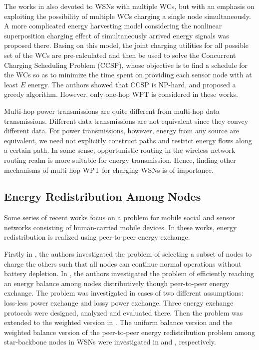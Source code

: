 \documentclass[journal,10pt]{IEEEtran}
\begin{document}
The works in \cite{Guo2017,Guo2016} also devoted to WSNs with multiple WCs, but with an emphasis on exploiting the possibility of multiple WCs charging a single node simultaneously. A more complicated energy harvesting model considering the nonlinear superposition charging effect of simultaneously arrived energy signals was proposed there. Basing on this model, the joint charging utilities for all possible set of the WCs are pre-calculated and then be used to solve the Concurrent Charging Scheduling Problem (CCSP), whose objective is to find a schedule for the WCs so as to minimize the time spent on providing each sensor node with at least $E$ energy. The authors showed that CCSP is NP-hard, and proposed a greedy algorithm. However, only one-hop WPT is considered in these works.

Multi-hop power transmissions are quite different from multi-hop data transmissions. Different data transmissions are not equivalent since they convey different data. For power transmissions, however, energy from any source are equivalent, we need not explicitly construct paths and restrict energy flows along a certain path. In some sense, opportunistic routing in the wireless network routing realm is more suitable for energy transmission. Hence, finding other mechanisms of multi-hop WPT for charging WSNs is of importance.

\subsection{Energy Redistribution Among Nodes}

Some series of recent works \cite{Bulut2014,Niko2016,Niko2017,Madhja2016,Madhja2017} focus on a problem for mobile social and sensor networks consisting of human-carried mobile devices. In these works, energy redistribution is realized using peer-to-peer energy exchange.

Firstly in \cite{Bulut2014}, the authors investigated the problem of selecting a subset of nodes to charge the others such that all nodes can continue normal operations without battery depletion. In \cite{Niko2016}, the authors investigated the problem of efficiently reaching an energy balance among nodes distributively though peer-to-peer energy exchange. The problem was investigated in cases of two different assumptions: loss-less power exchange and lossy power exchange. Three energy exchange protocols were designed, analyzed and evaluated there. Then the problem was extended to the weighted version in \cite{Niko2017}. The uniform balance version and the weighted balance version of the peer-to-peer energy redistribution problem among star-backbone nodes in WSNs were investigated in \cite{Madhja2016} and \cite{Madhja2017}, respectively.
\end{document}
